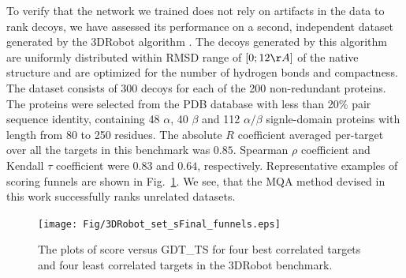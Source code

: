To verify that the network we trained does not rely on artifacts in
the data to rank decoys, we have assessed its performance on a second,
independent dataset generated by the 3DRobot
algorithm \cite{deng20163drobot}. The decoys generated by this
algorithm are uniformly distributed within RMSD range of $[0; 12\AA]$
of the native structure and are optimized for the number of hydrogen
bonds and compactness.
%
The dataset consists of 300 decoys for each of the 200 non-redundant proteins. The proteins were 
selected from the PDB database with less than 20\% pair sequence identity, containing 48 $\alpha$, 
40 $\beta$ and 112 $\alpha/\beta$ signle-domain proteins with length from 80 to 250 residues. 
The absolute  $R$ coefficient averaged per-target over all the
targets in this benchmark was $0.85$. Spearman $\rho$ coefficient
and Kendall $\tau$ coefficient were $0.83$ and $0.64$, respectively.
Representative examples of scoring funnels are shown in
Fig.~\ref{Fig:3DRobotBenchmark}.  We see, that the MQA method devised
in this work successfully ranks unrelated datasets.

\begin{figure}[H]
    \centering
    \texttt{[image: Fig/3DRobot\_set\_sFinal\_funnels.eps]}
%
    \caption{The plots of score versus GDT\_TS for four best correlated targets and four
    least correlated targets in the 3DRobot benchmark.}
    \label{Fig:3DRobotBenchmark}
\end{figure}
